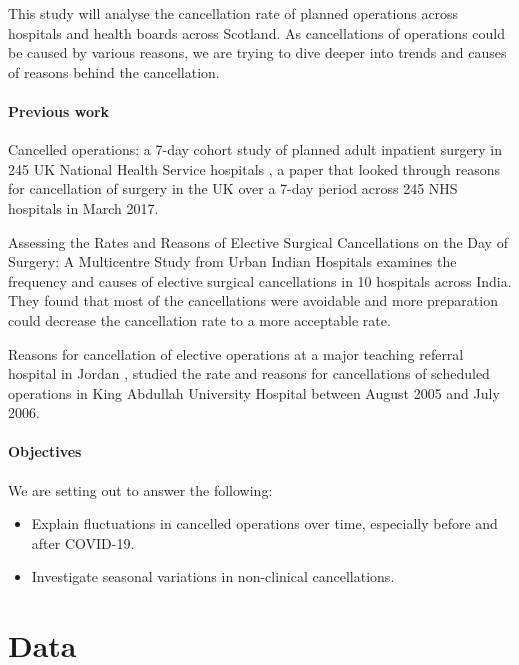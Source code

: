 \documentclass[11pt,a4paper]{article}
\begin{document}
This study will analyse the cancellation rate of planned operations across hospitals and health boards across Scotland. As cancellations of operations could be caused by various reasons, we are trying to dive deeper into trends and causes of reasons behind the cancellation.


\paragraph{Previous work}

Cancelled operations: a 7-day cohort study of planned adult inpatient surgery in 245 UK National Health Service hospitals \cite{wong_harris_moonesinghe_2018}, a paper that looked through reasons for cancellation of surgery in the UK over a 7-day period across 245 NHS hospitals in March 2017.

Assessing the Rates and Reasons of Elective Surgical Cancellations on the Day of Surgery: A Multicentre Study from Urban Indian Hospitals \cite{sarang_bhandoria_patil_gadgil_bains_khajanchi_kizhakkeveetil_dutta_shah_bhandarkar_etal._2021} examines the frequency and causes of elective surgical cancellations in 10 hospitals across India. They found that most of the cancellations were avoidable and more preparation could decrease the cancellation rate to a more acceptable rate. 

Reasons for cancellation of elective operations at a major teaching referral hospital in Jordan \cite{mesmar_shatnawi_faori_khader_2011}, studied the rate and reasons for cancellations of scheduled operations in King Abdullah University Hospital between August 2005 and July 2006.


\paragraph{Objectives}
We are setting out to answer the following:

\begin{itemize}
    \item Explain fluctuations in cancelled operations over time, especially before and after COVID-19.
    \item Investigate seasonal variations in non-clinical cancellations.
\end{itemize}



\section{Data}
\end{document}
